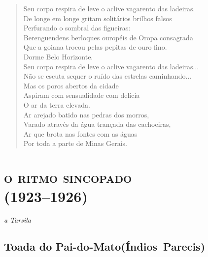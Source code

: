 \begin{verse}
Seu corpo respira de leve o aclive vagarento das ladeiras.\\
De longe em longe gritam solitários brilhos falsos\\
Perfurando o sombral das figueiras:\\
Berenguendens berloques ouropéis de Oropa consagrada\\
Que a goiana trocou pelas pepitas de ouro fino.\\
Dorme Belo Horizonte.\\
Seu corpo respira de leve o aclive vagarento das ladeiras...\\
Não se escuta sequer o ruído das estrelas caminhando...\\
Mas os poros abertos da cidade\\
Aspiram com sensualidade com delícia\\
O ar da terra elevada.\\
Ar arejado batido nas pedras dos morros,\\
Varado através da água trançada das cachoeiras,\\
Ar que brota nas fontes com as águas\\
Por toda a parte de Minas Gerais.
\end{verse}

\chapter[\textsc{o ritmo sincopado}\\Toada do Pai-do-Mato]{\textsc{o ritmo sincopado}\\(1923--1926)}


\begin{flushright}
\emph{a Tarsila}
\end{flushright}

\section{Toada do Pai-do-Mato\break (Índios~Parecis)}


